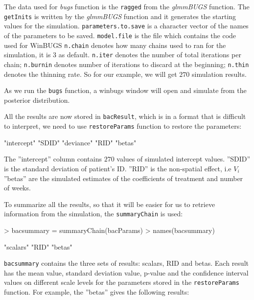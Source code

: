 \documentclass{article}
\begin{document}
The data used for \textit{bugs} function is the \verb!ragged! from the \textit{glmmBUGS} function. 
The \verb!getInits! is written by the \textit{glmmBUGS} function and it generates the starting values for the simulation. 
\verb!parameters.to.save! is a character vector of the names of the parameters to be saved.
\verb!model.file! is the file which contains the code used for WinBUGS
\verb!n.chain! denotes how many chains used to ran for the simulation, it is $3$ as default.
\verb!n.iter! denotes the number of total iterations per chain; 
\verb!n.burnin! denotes number of iterations to discard at the beginning; 
\verb!n.thin! denotes the thinning rate. So for our example, we will get $270$ simulation results.

As we run the \verb!bugs! function, a winbugs window will open and simulate from the posterior distribution.

All the results are now stored in \verb!bacResult!, which is in a format that is difficult to interpret, we need to use  \verb!restoreParams! function to restore the parameters: 

\begin{Schunk}
\begin{Soutput}
[1] "intercept" "SDID"      "deviance"  "RID"       "betas"    
\end{Soutput}
\end{Schunk}


The ''intercept'' column contains $270$ values of simulated intercept values. 
''SDID'' is the standard deviation of patient's ID. 
''RID'' is the non-spatial effect, i.e $V_i$
''betas'' are the simulated estimates of the coefficients of treatment and number of weeks. 

To summarize all the results, so that it will be easier for us to retrieve information from the simulation, the \verb!summaryChain! is used: 

\begin{Schunk}
\begin{Sinput}
> bacsummary = summaryChain(bacParams)
> names(bacsummary)
\end{Sinput}
\begin{Soutput}
[1] "scalars" "RID"     "betas"  
\end{Soutput}
\end{Schunk}
\verb!bacsummary! contains the three sets of results: scalars, RID and betas. Each result has the mean value, standard deviation value, p-value and the confidence interval values on different scale levels for the parameters stored in the \verb!restoreParams! function. 
For example, the ''betas'' gives the following results:
\end{document}
